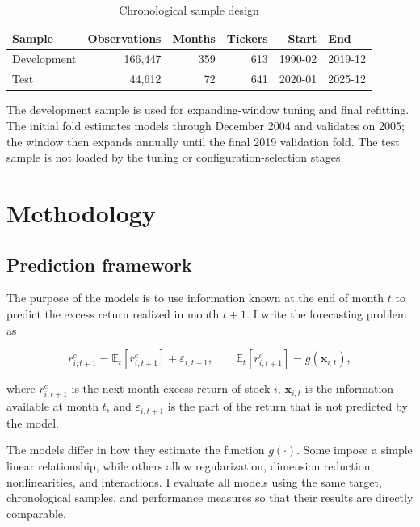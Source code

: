 \documentclass[11pt,a4paper]{article}
\begin{document}
\begin{table}[H]
\centering
\caption{Chronological sample design}
\label{tab:sample-splits}
\small
\begin{tabular}{lrrrrl}
\toprule
Sample & Observations & Months & Tickers & Start & End \\
\midrule
Development & 166,447 & 359 & 613 & 1990-02 & 2019-12 \\
Test        &  44,612 &  72 & 641 & 2020-01 & 2025-12 \\
\bottomrule
\end{tabular}
\end{table}

The development sample is used for expanding-window tuning and final refitting.
The initial fold estimates models through December 2004 and validates on 2005;
the window then expands annually until the final 2019 validation fold. The test
sample is not loaded by the tuning or configuration-selection stages.


\section{Methodology}
\label{sec:methodology}

\subsection{Prediction framework}

The purpose of the models is to use information known at the end of month
\(t\) to predict the excess return realized in month \(t+1\). I write the
forecasting problem as

\begin{equation}
 r^e_{i,t+1}
 =
 \mathbb{E}_t
 \left[
 r^e_{i,t+1}
 \right]
 +
 \varepsilon_{i,t+1},
 \qquad
 \mathbb{E}_t
 \left[
 r^e_{i,t+1}
 \right]
 =
 g(\mathbf{x}_{i,t}),
 \label{eq:framework}
\end{equation}

where \(r^e_{i,t+1}\) is the next-month excess return of stock \(i\),
\(\mathbf{x}_{i,t}\) is the information available at month \(t\), and
\(\varepsilon_{i,t+1}\) is the part of the return that is not predicted by the
model.

The models differ in how they estimate the function \(g(\cdot)\). Some impose a
simple linear relationship, while others allow regularization, dimension
reduction, nonlinearities, and interactions. I evaluate all models using the
same target, chronological samples, and performance measures so that their
results are directly comparable.
\end{document}

